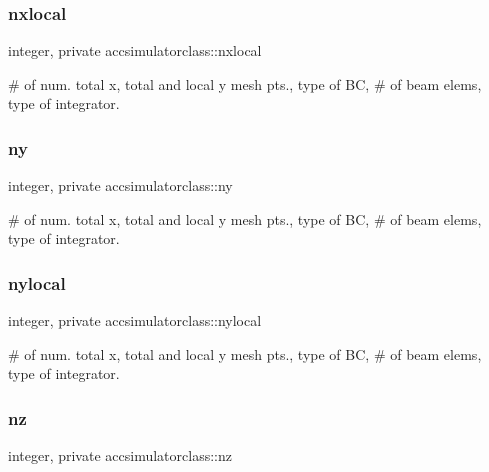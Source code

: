 \subsubsection{\texorpdfstring{nxlocal}{nxlocal}}
{\footnotesize\ttfamily integer, private accsimulatorclass\+::nxlocal\hspace{0.3cm}{\ttfamily [private]}}



\# of num. total x, total and local y mesh pts., type of BC, \# of beam elems, type of integrator. 

\mbox{\label{namespaceaccsimulatorclass_a51134373ee457cfeffdc9a5041a4d01c}} 
\subsubsection{\texorpdfstring{ny}{ny}}
{\footnotesize\ttfamily integer, private accsimulatorclass\+::ny\hspace{0.3cm}{\ttfamily [private]}}



\# of num. total x, total and local y mesh pts., type of BC, \# of beam elems, type of integrator. 

\mbox{\label{namespaceaccsimulatorclass_a48f766f48eeb1fb22aeff17c6c81e776}} 
\subsubsection{\texorpdfstring{nylocal}{nylocal}}
{\footnotesize\ttfamily integer, private accsimulatorclass\+::nylocal\hspace{0.3cm}{\ttfamily [private]}}



\# of num. total x, total and local y mesh pts., type of BC, \# of beam elems, type of integrator. 

\mbox{\label{namespaceaccsimulatorclass_a56a2e4504ed5d475f38307ecc7360ede}} 
\subsubsection{\texorpdfstring{nz}{nz}}
{\footnotesize\ttfamily integer, private accsimulatorclass\+::nz\hspace{0.3cm}{\ttfamily [private]}}



